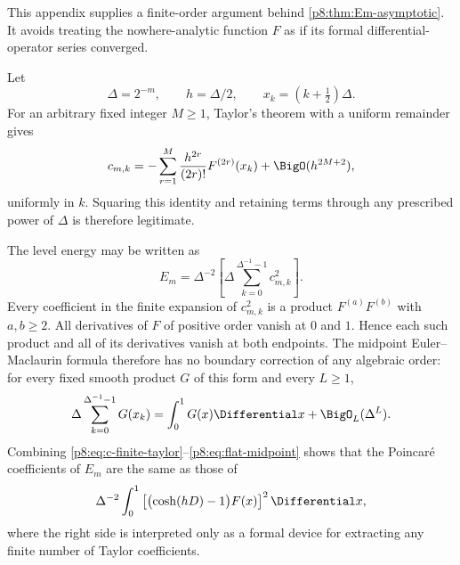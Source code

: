 \documentclass[11pt]{article}
\theoremstyle{definition}
\theoremstyle{remark}
\begin{document}
This appendix supplies a finite-order argument behind
\cref{p8:thm:Em-asymptotic}.  It avoids treating the nowhere-analytic function
$F$ as if its formal differential-operator series converged.

Let
\begin{equation}
 \Delta=2^{-m},\qquad h=\Delta/2,
 \qquad x_k=(k+\tfrac12)\Delta.                          \label{p8:eq:appendix-delta}
\end{equation}
For an arbitrary fixed integer $M\ge1$, Taylor's theorem with a uniform
remainder gives
\begin{equation}
 c_{m,k}=-\sum_{r=1}^{M}
 \frac{h^{2r}}{(2r)!}F^{(2r)}(x_k)
 +\BigO(h^{2M+2}),                                       \label{p8:eq:c-finite-taylor}
\end{equation}
uniformly in $k$.  Squaring this identity and retaining terms through any
prescribed power of $\Delta$ is therefore legitimate.

The level energy may be written as
\begin{equation}
 E_m=\Delta^{-2}
 \left[\Delta\sum_{k=0}^{\Delta^{-1}-1}c_{m,k}^2\right]. \label{p8:eq:Em-midpoint}
\end{equation}
Every coefficient in the finite expansion of $c_{m,k}^2$ is a product
$F^{(a)}F^{(b)}$ with $a,b\ge2$.  All derivatives of $F$ of positive order
vanish at $0$ and $1$.  Hence each such product and all of its derivatives
vanish at both endpoints.  The midpoint Euler--Maclaurin formula therefore
has no boundary correction of any algebraic order: for every fixed smooth
product $G$ of this form and every $L\ge1$,
\begin{equation}
 \Delta\sum_{k=0}^{\Delta^{-1}-1}G(x_k)
 =\int_0^1G(x)\Differential x+\BigO_L(\Delta^L).                  \label{p8:eq:flat-midpoint}
\end{equation}
Combining \eqref{p8:eq:c-finite-taylor}--\eqref{p8:eq:flat-midpoint} shows that the
Poincaré coefficients of $E_m$ are the same as those of
\begin{equation}
 \Delta^{-2}\int_0^1
 \left[\bigl(\cosh(hD)-1\bigr)F(x)\right]^2\Differential x,       \label{p8:eq:operator-asymptotic}
\end{equation}
where the right side is interpreted only as a formal device for extracting
any finite number of Taylor coefficients.
\end{document}
